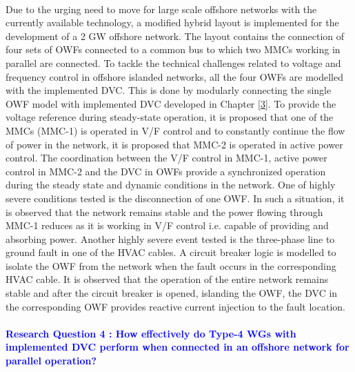 \paragraph{} Due to the urging need to move for large scale offshore networks with the currently available technology, a modified hybrid layout is implemented for the development of a 2 GW offshore network. The layout contains the connection of four sets of \gls{OWF}s connected to a common bus to which two \gls{MMC}s working in parallel are connected. To tackle the technical challenges related to voltage and frequency control in offshore islanded networks, all the four \gls{OWF}s are modelled with the implemented \gls{DVC}. This is done by modularly connecting the single \gls{OWF} model with implemented \gls{DVC} developed in Chapter \ref{3}. To provide the voltage reference during steady-state operation, it is proposed that one of the \gls{MMC}s (\gls{MMC}-1) is operated in V/F control and to constantly continue the flow of power in the network, it is proposed that \gls{MMC}-2 is operated in active power control. %
The coordination between the V/F control in \gls{MMC}-1, active power control in \gls{MMC}-2 and the \gls{DVC} in \gls{OWF}s provide a synchronized operation during the steady state and dynamic conditions in the network. One of highly severe conditions tested is the disconnection of one \gls{OWF}. In such a situation, it is observed that the network remains stable and the power flowing through \gls{MMC}-1 reduces as it is working in V/F control i.e. capable of providing and absorbing power. Another highly severe event tested is the three-phase line to ground fault in one of the \gls{HVAC} cables. A circuit breaker logic is modelled to isolate the \gls{OWF} from the network when the fault occurs in the corresponding \gls{HVAC} cable. It is observed that the operation of the entire network remains stable and after the circuit breaker is opened, islanding the \gls{OWF}, the \gls{DVC} in the corresponding \gls{OWF} provides reactive current injection to the fault location.

\paragraph{\textcolor{blue}{Research Question 4 : How effectively do Type-4 \gls{WG}s with implemented \gls{DVC} perform when connected in an offshore network for parallel operation?}}

